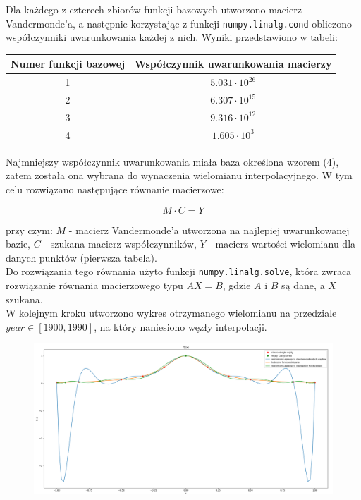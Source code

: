 \documentclass{article}
\begin{document}
	Dla każdego z czterech zbiorów funkcji bazowych utworzono macierz Vandermonde'a, a następnie korzystając z funkcji \texttt{numpy.linalg.cond} obliczono współczynniki uwarunkowania każdej z nich. Wyniki przedstawiono w tabeli: 
	
	\begin{center}
		\begin{tabular}{|c|c|}
  			\hline 
  			Numer funkcji bazowej & Współczynnik uwarunkowania macierzy\\
  			\hline
  			1 & $5.031 \cdot 10^{26}$ \\
  			2 & $6.307 \cdot 10^{15}$ \\
  			3 & $9.316 \cdot 10^{12}$ \\
  			4 & $1.605 \cdot 10^{3}$ \\
  			\hline
		\end{tabular} 
		
	\end{center}
	
	Najmniejszy współczynnik uwarunkowania miała baza określona wzorem (4), zatem została ona wybrana do wynaczenia wielomianu interpolacyjnego. W tym celu rozwiązano następujące równanie macierzowe:
	
	\begin{equation}
		M \cdot C = Y
	\end{equation}
	
	przy czym: $M$ - macierz Vandermonde'a utworzona na najlepiej uwarunkowanej bazie, $C$ - szukana macierz współczynników, $Y$ - macierz wartości wielomianu dla danych punktów (pierwsza tabela). \\
	Do rozwiązania tego równania użyto funkcji \texttt{numpy.linalg.solve}, która zwraca rozwiązanie równania macierzowego typu $AX=B$, gdzie $A$ i $B$ są dane, a $X$ szukana. \\
	W kolejnym kroku utworzono wykres otrzymanego wielomianu na przedziale $year \in [1900, 1990]$, na który naniesiono węzły interpolacji.
	
	
	\begin{figure}[h]
    		\centering
  		\includegraphics[scale = 0.9]{wykres1.png}
	\end{figure}
	
\end{document}

